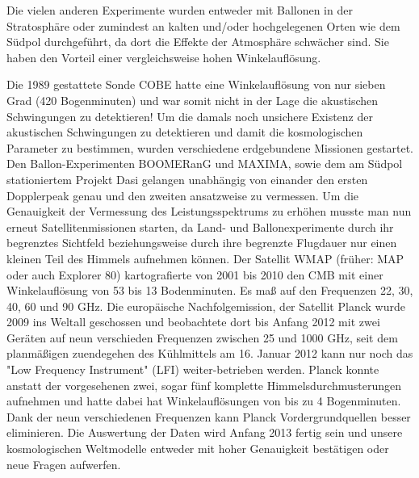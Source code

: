 \documentclass[10pt,a4paper]{article}
\begin{document}
Die vielen anderen Experimente wurden entweder mit Ballonen in der Stratosphäre oder zumindest an kalten und/oder hochgelegenen Orten wie dem Südpol durchgeführt, da dort die Effekte der Atmosphäre schwächer sind. Sie haben den Vorteil einer vergleichsweise hohen Winkelauflösung.

Die 1989 gestattete Sonde COBE hatte eine Winkelauflösung von nur sieben Grad (420 Bogenminuten) und war somit nicht in der Lage die akustischen Schwingungen zu detektieren! Um die damals noch unsichere Existenz der akustischen Schwingungen zu detektieren und damit die kosmologischen Parameter zu bestimmen, wurden verschiedene erdgebundene Missionen gestartet. Den Ballon-Experimenten BOOMERanG und MAXIMA, sowie dem am Südpol stationiertem Projekt Dasi gelangen unabhängig von einander den ersten Dopplerpeak genau und den zweiten ansatzweise zu vermessen. Um die Genauigkeit der Vermessung des Leistungsspektrums zu erhöhen musste man nun erneut Satellitenmissionen starten, da Land- und Ballonexperimente durch ihr begrenztes Sichtfeld beziehungsweise durch ihre begrenzte Flugdauer nur einen kleinen Teil des Himmels aufnehmen können.
Der Satellit WMAP (früher: MAP oder auch Explorer 80) kartografierte von 2001 bis 2010 den CMB mit einer Winkelauflösung von 53 bis 13 Bodenminuten.\cite{PJ1} Es maß auf den Frequenzen 22, 30, 40, 60 und 90 GHz.
Die europäische Nachfolgemission, der Satellit Planck wurde 2009 ins Weltall geschossen und beobachtete dort bis Anfang 2012 mit zwei Geräten auf neun verschieden Frequenzen zwischen 25 und 1000 GHz, seit dem planmäßigen zuendegehen des Kühlmittels am 16. Januar 2012 kann nur noch das "Low Frequency Instrument" (LFI) weiter-betrieben werden\cite{PJ1}\cite{pm}.
Planck konnte anstatt der vorgesehenen zwei, sogar fünf komplette Himmelsdurchmusterungen aufnehmen und hatte dabei hat Winkelauflösungen von bis zu 4 Bogenminuten. %
Dank der neun verschiedenen Frequenzen kann Planck Vordergrundquellen besser eliminieren. Die Auswertung der Daten wird Anfang 2013 fertig sein und unsere kosmologischen Weltmodelle entweder mit hoher Genauigkeit bestätigen oder neue Fragen aufwerfen.

{}

\end{document}

